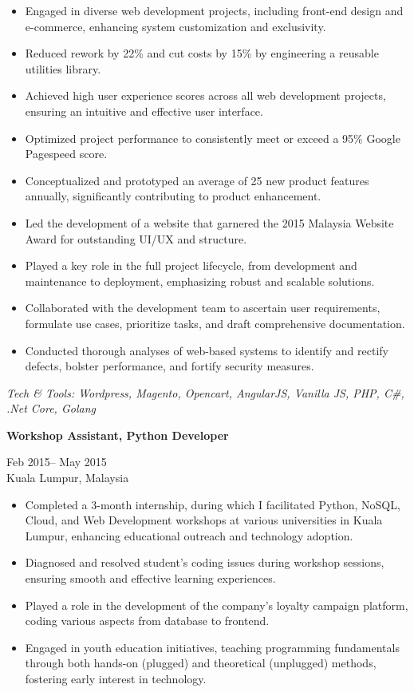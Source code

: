 \documentclass[10pt,a4paper,ragged2e,withhyper]{altacv}
\renewcommand{\cvevent}[4]{%
  \textbf{#1} %
  \hfill %
  \begin{minipage}[t]{.5\linewidth}
    \raggedleft %
    \small#3 %
    \\ %
    #4 %
  \end{minipage}
  \vspace{\baselineskip} %
}
\begin{document}
\begin{itemize}
  \item Engaged in diverse web development projects, including front-end design and e-commerce, enhancing system customization and exclusivity.
  \item Reduced rework by 22\% and cut costs by 15\% by engineering a reusable utilities library.
  \item Achieved high user experience scores across all web development projects, ensuring an intuitive and effective user interface.
  \item Optimized project performance to consistently meet or exceed a 95\% Google Pagespeed score.
  \item Conceptualized and prototyped an average of 25 new product features annually, significantly contributing to product enhancement.
  \item Led the development of a website that garnered the 2015 Malaysia Website Award for outstanding UI/UX and structure.
  \item Played a key role in the full project lifecycle, from development and maintenance to deployment, emphasizing robust and scalable solutions.
  \item Collaborated with the development team to ascertain user requirements, formulate use cases, prioritize tasks, and draft comprehensive documentation.
  \item Conducted thorough analyses of web-based systems to identify and rectify defects, bolster performance, and fortify security measures.
\end{itemize}

\vspace{0.5cm}

\textit{Tech \& Tools: Wordpress, Magento, Opencart, AngularJS, Vanilla JS, PHP, C\#, .Net Core, Golang}

\divider

\cvevent{Workshop Assistant, Python Developer }{Kidocode}{Feb 2015-- May 2015}{Kuala Lumpur, Malaysia}


\begin{itemize}
  \item Completed a 3-month internship, during which I facilitated Python, NoSQL, Cloud, and Web Development workshops at various universities in Kuala Lumpur, enhancing educational outreach and technology adoption.
  \item Diagnosed and resolved student's coding issues during workshop sessions, ensuring smooth and effective learning experiences.
  \item Played a role in the development of the company's loyalty campaign platform, coding various aspects from database to frontend.
  \item Engaged in youth education initiatives, teaching programming fundamentals through both hands-on (plugged) and theoretical (unplugged) methods, fostering early interest in technology.
\end{itemize}
\end{document}
